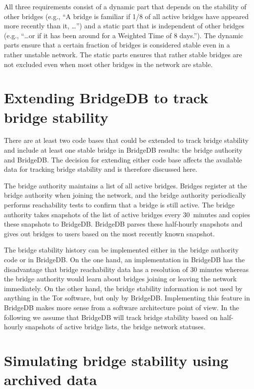 \documentclass{article}
\begin{document}
All three requirements consist of a dynamic part that depends on the
stability of other bridges (e.g., ``A bridge is familiar if 1/8 of all
active bridges have appeared more recently than it, \ldots'') and a static
part that is independent of other bridges (e.g., ``\ldots or if it has
been around for a Weighted Time of 8 days.'').
The dynamic parts ensure that a certain fraction of bridges is considered
stable even in a rather unstable network.
The static parts ensures that rather stable bridges are not excluded even
when most other bridges in the network are stable.

\section{Extending BridgeDB to track bridge stability}

There are at least two code bases that could be extended to track bridge
stability and include at least one stable bridge in BridgeDB results: the
bridge authority and BridgeDB.
The decision for extending either code base affects the available data
for tracking bridge stability and is therefore discussed here.

The bridge authority maintains a list of all active bridges.
Bridges register at the bridge authority when joining the network, and the
bridge authority periodically performs reachability tests to confirm that
a bridge is still active.
The bridge authority takes snapshots of the list of active bridges every
30~minutes and copies these snapshots to BridgeDB.
BridgeDB parses these half-hourly snapshots and gives out bridges to users
based on the most recently known snapshot.

The bridge stability history can be implemented either in the bridge
authority code or in BridgeDB.
On the one hand, an implementation in BridgeDB has the disadvantage that
bridge reachability data has a resolution of 30 minutes whereas the bridge
authority would learn about bridges joining or leaving the network
immediately.
On the other hand, the bridge stability information is not used by
anything in the Tor software, but only by BridgeDB.
Implementing this feature in BridgeDB makes more sense from a software
architecture point of view.
In the following we assume that BridgeDB will track bridge stability based
on half-hourly snapshots of active bridge lists, the bridge network
statuses.

\section{Simulating bridge stability using archived data}
\end{document}
